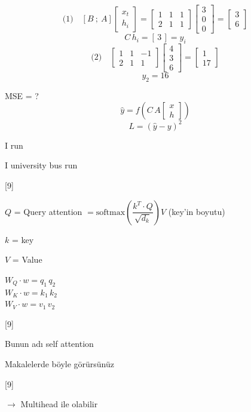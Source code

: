 \documentclass[11pt,a4paper]{article}
\begin{document}
\[ \text{(1)}\quad [B\ ;\ A]\begin{bmatrix}x_t\\h_i\end{bmatrix}=\begin{bmatrix}1&1&1\\2&1&1\end{bmatrix}\begin{bmatrix}3\\0\\0\end{bmatrix}=\begin{bmatrix}3\\6\end{bmatrix} \]
\[ C\,h_i=[\,3\,]=y_i \]
\[ \text{(2)}\quad \begin{bmatrix}1&1&-1\\2&1&1\end{bmatrix}\begin{bmatrix}4\\3\\6\end{bmatrix}=\begin{bmatrix}1\\17\end{bmatrix} \]
\[ y_2=16 \]

MSE = ?
\[ \hat{y}=f\!\left(C\,A\begin{bmatrix}x\\h\end{bmatrix}\right) \]
\[ L=(\hat{y}-y)^2 \]

I run

I university bus run

[9]

$Q$ = Query \qquad attention $= \mathrm{softmax}\!\left(\dfrac{k^{T}\cdot Q}{\sqrt{d_k}}\right)V$ \quad (key'in boyutu)

$k$ = key

$V$ = Value

$W_Q\cdot w=q_1\,q_2$\\
$W_K\cdot w=k_1\,k_2$\\
$W_V\cdot w=v_1\,v_2$

[9]

Bunun adı self attention

Makalelerde böyle görürsünüz

[9]

$\to$ Multihead ile olabilir
\end{document}
